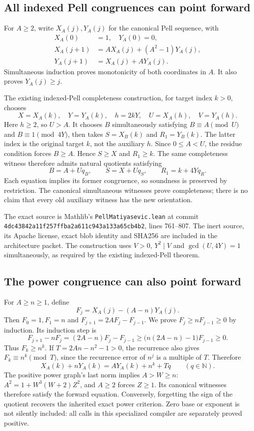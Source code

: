 \subsection{All indexed Pell congruences can point forward}

For $A\ge2$, write $X_A(j),Y_A(j)$ for the canonical Pell sequence, with
\[
\begin{split}
 X_A(0)&=1,\quad Y_A(0)=0,\\
 X_A(j+1)&=AX_A(j)+(A^2-1)Y_A(j),\\
 Y_A(j+1)&=X_A(j)+AY_A(j).
\end{split}
\]
Simultaneous induction proves monotonicity of both coordinates in $A$.
It also proves $Y_A(j)\ge j$.

The existing indexed-Pell completeness construction, for target index
$k>0$, chooses
\[
 X=X_A(k),\quad Y=Y_A(k),\quad h=2kY,\quad
 U=X_A(h),\quad V=Y_A(h).
\]
Here $h\ge2$, so $U>A$. It chooses $B$ simultaneously satisfying
$B\equiv A\pmod U$ and $B\equiv1\pmod{4Y}$, then takes
$S=X_B(k)$ and $R_1=Y_B(k)$. The latter index is the original target
$k$, not the auxiliary $h$. Since $0\le A<U$, the residue condition
forces $B\ge A$. Hence $S\ge X$ and $R_1\ge k$. The same completeness
witness therefore admits natural quotients satisfying
\[
 B=A+Uq_B,\qquad S=X+Uq_S,\qquad R_1=k+4Yq_R.
\]
Each equation implies its former congruence, so soundness is preserved
by restriction. The canonical simultaneous witnesses prove completeness;
there is no claim that every old auxiliary witness has the new orientation.

The exact source is Mathlib's \texttt{PellMatiyasevic.lean} at commit
\texttt{4dc43842a11f257ffba2a611c943a133a65cb4b2}, lines 761--807.
The inert source, its Apache license, exact blob identity and SHA256 are
included in the architecture packet. The construction uses $V>0$,
$Y^2\mid V$ and $\gcd(U,4Y)=1$ simultaneously, as required by the
existing indexed-Pell theorem.

\subsection{The power congruence can also point forward}

For $A\ge n\ge1$, define
\[
 F_j=X_A(j)-(A-n)Y_A(j).
\]
Then $F_0=1,F_1=n$ and $F_{j+1}=2AF_j-F_{j-1}$. We prove
$F_j\ge nF_{j-1}\ge0$ by induction. Its induction step is
\[
 F_{j+1}-nF_j=(2A-n)F_j-F_{j-1}
 \ge\bigl(n(2A-n)-1\bigr)F_{j-1}\ge0.
\]
Thus $F_k\ge n^k$. If $T=2An-n^2-1>0$, the recurrence also gives
$F_k\equiv n^k\pmod T$, since the recurrence error of $n^j$ is a
multiple of $T$. Therefore
\[
 X_A(k)+nY_A(k)=AY_A(k)+n^k+Tq
 \qquad(q\in\mathbb N).
\]
The positive power graph's last norm implies $A>W\ge n$:
$A^2=1+W^3(W+2)Z^2$, and $A\ge2$ forces $Z\ge1$.
Its canonical witnesses therefore satisfy the forward equation. Conversely,
forgetting the sign of the quotient recovers the inherited exact power
criterion. Zero base or exponent is not silently included: all calls in
this specialized compiler are separately proved positive.

